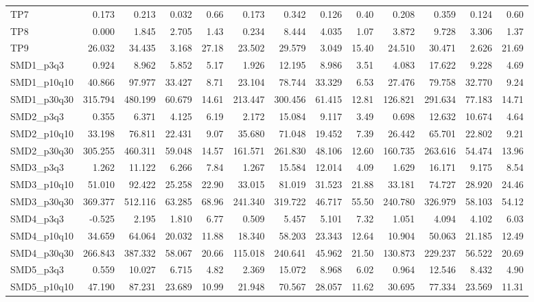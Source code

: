\begin{longtable}{lrrrrrrrrrrrr}
TP7 & 0.173 & 0.213 & 0.032 & 0.66 & 0.173 & 0.342 & 0.126 & 0.40 & 0.208 & 0.359 & 0.124 & 0.60 \\
TP8 & 0.000 & 1.845 & 2.705 & 1.43 & 0.234 & 8.444 & 4.035 & 1.07 & 3.872 & 9.728 & 3.306 & 1.37 \\
TP9 & 26.032 & 34.435 & 3.168 & 27.18 & 23.502 & 29.579 & 3.049 & 15.40 & 24.510 & 30.471 & 2.626 & 21.69 \\
SMD1\_p3q3 & 0.924 & 8.962 & 5.852 & 5.17 & 1.926 & 12.195 & 8.986 & 3.51 & 4.083 & 17.622 & 9.228 & 4.69 \\
SMD1\_p10q10 & 40.866 & 97.977 & 33.427 & 8.71 & 23.104 & 78.744 & 33.329 & 6.53 & 27.476 & 79.758 & 32.770 & 9.24 \\
SMD1\_p30q30 & 315.794 & 480.199 & 60.679 & 14.61 & 213.447 & 300.456 & 61.415 & 12.81 & 126.821 & 291.634 & 77.183 & 14.71 \\
SMD2\_p3q3 & 0.355 & 6.371 & 4.125 & 6.19 & 2.172 & 15.084 & 9.117 & 3.49 & 0.698 & 12.632 & 10.674 & 4.64 \\
SMD2\_p10q10 & 33.198 & 76.811 & 22.431 & 9.07 & 35.680 & 71.048 & 19.452 & 7.39 & 26.442 & 65.701 & 22.802 & 9.21 \\
SMD2\_p30q30 & 305.255 & 460.311 & 59.048 & 14.57 & 161.571 & 261.830 & 48.106 & 12.60 & 160.735 & 263.616 & 54.474 & 13.96 \\
SMD3\_p3q3 & 1.262 & 11.122 & 6.266 & 7.84 & 1.267 & 15.584 & 12.014 & 4.09 & 1.629 & 16.171 & 9.175 & 8.54 \\
SMD3\_p10q10 & 51.010 & 92.422 & 25.258 & 22.90 & 33.015 & 81.019 & 31.523 & 21.88 & 33.181 & 74.727 & 28.920 & 24.46 \\
SMD3\_p30q30 & 369.377 & 512.116 & 63.285 & 68.96 & 241.340 & 319.722 & 46.717 & 55.50 & 240.780 & 326.979 & 58.103 & 54.12 \\
SMD4\_p3q3 & -0.525 & 2.195 & 1.810 & 6.77 & 0.509 & 5.457 & 5.101 & 7.32 & 1.051 & 4.094 & 4.102 & 6.03 \\
SMD4\_p10q10 & 34.659 & 64.064 & 20.032 & 11.88 & 18.340 & 58.203 & 23.343 & 12.64 & 10.904 & 50.063 & 21.185 & 12.49 \\
SMD4\_p30q30 & 266.843 & 387.332 & 58.067 & 20.66 & 115.018 & 240.641 & 45.962 & 21.50 & 130.873 & 229.237 & 56.522 & 20.69 \\
SMD5\_p3q3 & 0.559 & 10.027 & 6.715 & 4.82 & 2.369 & 15.072 & 8.968 & 6.02 & 0.964 & 12.546 & 8.432 & 4.90 \\
SMD5\_p10q10 & 47.190 & 87.231 & 23.689 & 10.99 & 21.948 & 70.567 & 28.057 & 11.62 & 30.695 & 77.334 & 23.569 & 11.31 \\

\end{longtable}
